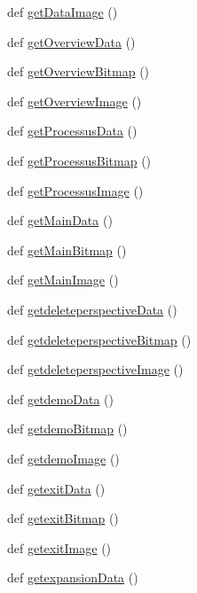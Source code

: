 \begin{DoxyCompactItemize}
def \hyperlink{namespaceimages_a2e4a6f1439de847a5ce440e0ea37edaa}{get\+Data\+Image} ()
\item 
def \hyperlink{namespaceimages_ac431d64f5cb525f4d569389b880983b9}{get\+Overview\+Data} ()
\item 
def \hyperlink{namespaceimages_a92263497d1b03c4d370a88e7cf5f38d0}{get\+Overview\+Bitmap} ()
\item 
def \hyperlink{namespaceimages_a3f687e69d4a1d3e3557513c673a4a91c}{get\+Overview\+Image} ()
\item 
def \hyperlink{namespaceimages_add9d06810f66b7f5621d259a3a02df09}{get\+Processus\+Data} ()
\item 
def \hyperlink{namespaceimages_a0b31f0081ba1ffc239df9e1b29d4c02e}{get\+Processus\+Bitmap} ()
\item 
def \hyperlink{namespaceimages_a6c329db2429a821439f24528acc6ad29}{get\+Processus\+Image} ()
\item 
def \hyperlink{namespaceimages_a67ab05f76d8ee82ee207e9313f1452b1}{get\+Main\+Data} ()
\item 
def \hyperlink{namespaceimages_a13b0b106848f0bb45083014d906d9c93}{get\+Main\+Bitmap} ()
\item 
def \hyperlink{namespaceimages_a64d996854da6403c27adf405ded8ec7e}{get\+Main\+Image} ()
\item 
def \hyperlink{namespaceimages_adf4a80b7f1fe515d188f8edc76ad9f8c}{getdeleteperspective\+Data} ()
\item 
def \hyperlink{namespaceimages_aa5a811e2cd617bf0f033ba016f65e71b}{getdeleteperspective\+Bitmap} ()
\item 
def \hyperlink{namespaceimages_a6f233689e4bb013dc7be2b86300ce54e}{getdeleteperspective\+Image} ()
\item 
def \hyperlink{namespaceimages_aefe2e85aaaee18eb0ec08f7a35451037}{getdemo\+Data} ()
\item 
def \hyperlink{namespaceimages_aceba80a531ffd0e0ce56747f172bf6b2}{getdemo\+Bitmap} ()
\item 
def \hyperlink{namespaceimages_a28056879b7958528bee6430c85d879e2}{getdemo\+Image} ()
\item 
def \hyperlink{namespaceimages_a7e5bdbd335598e57701536741f4d8997}{getexit\+Data} ()
\item 
def \hyperlink{namespaceimages_abd9fcc57cc491312e7481b88c766a011}{getexit\+Bitmap} ()
\item 
def \hyperlink{namespaceimages_aae00a8f5f5671e8fd7ed806f7f729f9f}{getexit\+Image} ()
\item 
def \hyperlink{namespaceimages_ac8cc40b8acd6eebb42a77ab79cc39b24}{getexpansion\+Data} ()

\end{DoxyCompactItemize}
